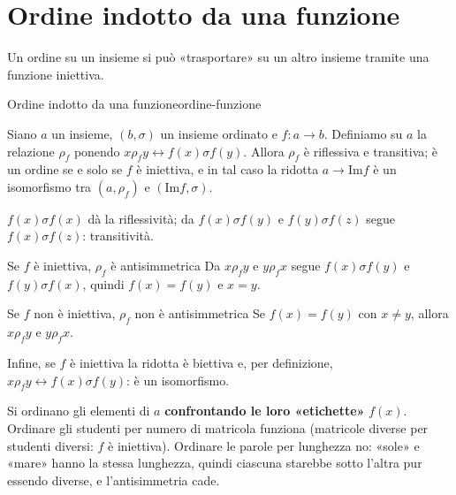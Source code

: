 \newpage
\section{Ordine indotto da una funzione}\label{sec:ordine-funzione}

Un ordine su un insieme si può «trasportare» su un altro insieme tramite una funzione iniettiva.

\begin{concetto}
\begin{Proposizione}{Ordine indotto da una funzione}{ordine-funzione}
    \begin{prerequisiti}
    \end{prerequisiti}
    Siano $a$ un insieme, $(b, \sigma)$ un insieme ordinato e $f \colon a \to b$. Definiamo su $a$ la relazione $\rho_f$ ponendo
    $x \rho_f y \leftrightarrow f(x) \sigma f(y)$. Allora $\rho_f$ è riflessiva e transitiva; è un ordine se e solo se $f$ è iniettiva, e in tal caso la ridotta
    $a \to \mathrm{Im} f$ è un isomorfismo tra $(a, \rho_f)$ e $(\mathrm{Im} f, \sigma)$.
\end{Proposizione}
\begin{dimostrazione}
    $f(x) \sigma f(x)$ dà la riflessività; da $f(x) \sigma f(y)$ e $f(y) \sigma f(z)$ segue $f(x) \sigma f(z)$: transitività.
    \begin{caso}{Se $f$ è iniettiva, $\rho_f$ è antisimmetrica}
        Da $x \rho_f y$ e $y \rho_f x$ segue $f(x) \sigma f(y)$ e $f(y) \sigma f(x)$, quindi $f(x) = f(y)$ e $x = y$.
    \end{caso}
    \begin{caso}{Se $f$ non è iniettiva, $\rho_f$ non è antisimmetrica}
        Se $f(x) = f(y)$ con $x \neq y$, allora $x \rho_f y$ e $y \rho_f x$.
    \end{caso}
    Infine, se $f$ è iniettiva la ridotta è biettiva e, per definizione, $x \rho_f y \leftrightarrow f(x) \sigma f(y)$: è un isomorfismo.
\end{dimostrazione}
\end{concetto}

\begin{spiegazione}
    Si ordinano gli elementi di $a$ \textbf{confrontando le loro «etichette»} $f(x)$. Ordinare gli studenti per numero di matricola
    funziona (matricole diverse per studenti diversi: $f$ è iniettiva). Ordinare le parole per lunghezza no: «sole» e «mare» hanno la stessa
    lunghezza, quindi ciascuna starebbe sotto l'altra pur essendo diverse, e l'antisimmetria cade.
\end{spiegazione}


